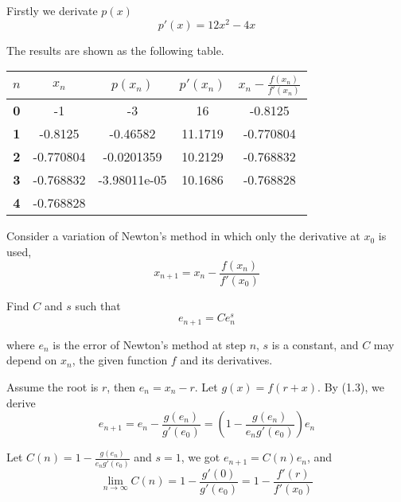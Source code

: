 \documentclass[11pt]{elegantbook}
\begin{document}
\begin{solution}
Firstly we derivate $p(x)$
\begin{equation*}
  p'(x)=12x^2-4x
\end{equation*}

The results are shown as the following table.
  \begin{table}[htbp]
    \centering
    \small
    \begin{tabular}{|c|c|c|c|c|}
    \hline
    \textbf{$n$} & \textbf{$x_n$} & \textbf{$p(x_n)$} & \textbf{$p'(x_n)$} & \textbf{$x_n-\frac{f(x_n)}{f'(x_n)}$} \\ \hline
    \textbf{0}   & -1             & -3                & 16                 & -0.8125                               \\ \hline
    \textbf{1}   & -0.8125        & -0.46582          & 11.1719            & -0.770804                             \\ \hline
    \textbf{2}   & -0.770804      & -0.0201359        & 10.2129            & -0.768832                             \\ \hline
    \textbf{3}   & -0.768832      & -3.98011e-05      & 10.1686            & -0.768828                             \\ \hline
    \textbf{4}   & -0.768828      &                   &                    &                                       \\ \hline
    \end{tabular}
  \end{table}
\end{solution}

\begin{problem}
  Consider a variation of Newton's method in which only the derivative at $x_0$ is used,
  \begin{equation}
    x_{n+1}=x_n-\frac{f(x_n)}{f'(x_0)}
  \end{equation}

  Find $C$ and $s$ such that
  \begin{equation*}
    e_{n+1}=Ce_n^s
  \end{equation*}

  where $e_n$ is the error of Newton's method at step $n$, $s$ is a constant, and $C$ may depend on $x_n$, the given function $f$ and its derivatives.
\end{problem}

\begin{solution}
  Assume the root is $r$, then $e_n=x_n-r$. Let $g(x)=f(r+x)$. By (1.3), we derive 
  \begin{equation*}
    e_{n+1}=e_n-\frac{g(e_n)}{g'(e_0)}=\left(1-\frac{g(e_n)}{e_n g'(e_0)}\right)e_n
  \end{equation*}

  Let $C(n)=1-\frac{g(e_n)}{e_n g'(e_0)}$ and $s=1$, we got $e_{n+1}=C(n)e_n$, and 
  \begin{equation*}
    \lim_{n\to \infty} C(n) = 1-\frac{g'(0)}{g'(e_0)}= 1-\frac{f'(r)}{f'(x_0)}
  \end{equation*}
\end{solution}
\end{document}
